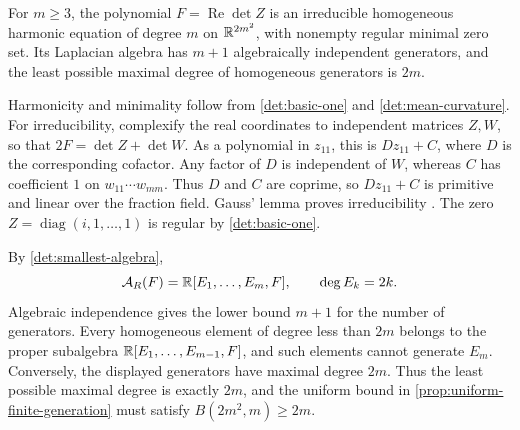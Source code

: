 \begin{example}
\label{ex:determinant-generator-degrees}
For \(m\ge3\), the polynomial \(F=\operatorname{Re}\det Z\) is
an irreducible homogeneous harmonic equation of degree \(m\) on
\(\mathbb R^{2m^2}\), with nonempty regular minimal zero set. Its
Laplacian algebra has \(m+1\) algebraically independent generators,
and the least possible maximal degree of homogeneous generators
is \(2m\).

Harmonicity and minimality follow from \eqref{det:basic-one} and
\eqref{det:mean-curvature}. For irreducibility, complexify the real
coordinates to independent matrices \(Z,W\), so that
\(2F=\det Z+\det W\). As a polynomial in \(z_{11}\), this is
\(Dz_{11}+C\), where \(D\) is the corresponding cofactor. Any
factor of \(D\) is independent of \(W\), whereas \(C\) has
coefficient \(1\) on \(w_{11}\cdots w_{mm}\). Thus \(D\) and
\(C\) are coprime, so \(Dz_{11}+C\) is primitive and linear over
the fraction field. Gauss' lemma proves irreducibility
\cite[Chapter~VIII, Section~5, pp.~395--398]{Knapp16}.
The zero \(Z=\operatorname{diag}(i,1,\ldots,1)\) is regular by
\eqref{det:basic-one}.

By \eqref{det:smallest-algebra},
\[
 \mathcal A_R(F)=\mathbb R[E_1,\ldots,E_m,F],\qquad \deg E_k=2k.
\]
Algebraic independence gives the lower bound \(m+1\) for the
number of generators. Every homogeneous element of
degree less than \(2m\) belongs to the proper subalgebra
\(\mathbb R[E_1,\ldots,E_{m-1},F]\), and such elements cannot generate
\(E_m\). Conversely, the displayed generators have maximal
degree \(2m\). Thus the least possible maximal degree is exactly
\(2m\), and the uniform bound in
\cref{prop:uniform-finite-generation} must satisfy
\(B(2m^2,m)\ge2m\).
\end{example}

